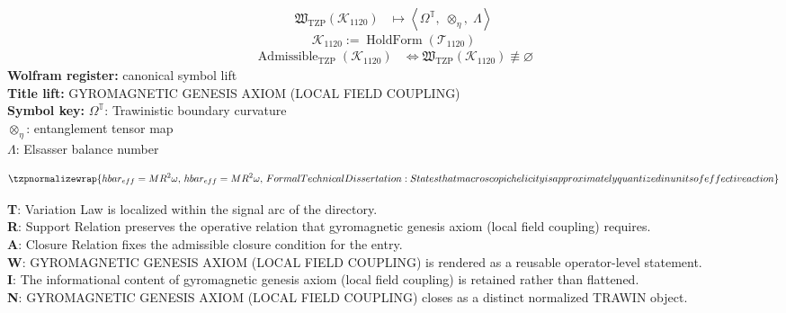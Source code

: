 \noindent
\begin{minipage}[t]{0.48\linewidth}
\begingroup
\small
\[
\begin{aligned}
\mathfrak{W}_{\mathrm{TZP}}\!\left(\mathcal{K}_{1120}\right)
&\longmapsto
\left\langle \Omega^{\mathbb{T}},\; \otimes_{\eta},\; \Lambda \right\rangle
\end{aligned}
\]
\[
\mathcal{K}_{1120}
:=
\operatorname{HoldForm}\!\left(\mathcal{T}_{1120}\right)
\]
\[
\begin{aligned}
\operatorname{Admissible}_{\mathrm{TZP}}\!\left(\mathcal{K}_{1120}\right)
&\Longleftrightarrow
\mathfrak{W}_{\mathrm{TZP}}\!\left(\mathcal{K}_{1120}\right)\not\equiv\varnothing
\end{aligned}
\]
\textbf{Wolfram register:} canonical symbol lift\\
\textbf{Title lift:} GYROMAGNETIC GENESIS AXIOM (LOCAL FIELD COUPLING)\\
\textbf{Symbol key:} \(\Omega^{\mathbb{T}}\): Trawinistic boundary curvature\\ \(\otimes_{\eta}\): entanglement tensor map\\ \(\Lambda\): Elsasser balance number
\par
\endgroup
\end{minipage}\hfill
\begin{minipage}[t]{0.48\linewidth}
\[
\tzpnormalizewrap{hbar_{eff} = M R^2 \omega,\,hbar_{eff} = M R^2 \omega,\,Formal Technical Dissertation: States that macroscopic helicity is approximately quantized in units of effective action}
\]

\small
\textbf{T}: Variation Law is localized within the signal arc of the directory.\\
\textbf{R}: Support Relation preserves the operative relation that gyromagnetic genesis axiom (local field coupling) requires.\\
\textbf{A}: Closure Relation fixes the admissible closure condition for the entry.\\
\textbf{W}: GYROMAGNETIC GENESIS AXIOM (LOCAL FIELD COUPLING) is rendered as a reusable operator-level statement.\\
\textbf{I}: The informational content of gyromagnetic genesis axiom (local field coupling) is retained rather than flattened.\\
\textbf{N}: GYROMAGNETIC GENESIS AXIOM (LOCAL FIELD COUPLING) closes as a distinct normalized TRAWIN object.
\normalsize
\end{minipage}

